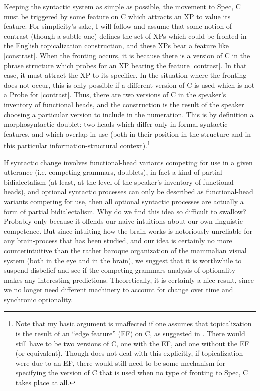 Keeping the syntactic system as simple as possible, the movement to Spec, C must be triggered by some feature on C which attracts an XP to value its feature.
For simplicity's sake, I will follow \citet{caitldiss} and assume that some notion of contrast (though a subtle one) defines the set of XPs which could be fronted in the English topicalization construction, and these XPs bear a feature like [constrast].
When the fronting occurs, it is because there is a version of C in the phrase structure which probes for an XP bearing the feature [contrast].
In that case, it must attract the XP to its specifier.
In the situation where the fronting does not occur, this is only possible if a different version of C is used which is not a Probe for [contrast].
Thus, there are two versions of C in the speaker's inventory of functional heads, and the construction is the result of the speaker choosing a particular version to include in the numeration.
This is by definition a morphosyntactic doublet: two heads which differ only in formal syntactic features, and which overlap in use (both in their position in the structure and in this particular information-structural context).\footnote{Note that my basic argument is unaffected if one assumes that topicalization is the result of an ``edge feature'' (EF) on C, as suggested in \citet[][151]{chomsky2008}.
There would still have to be two versions of C, one with the EF, and one without the EF (or equivalent).
Though \citet{chomsky2008} does not deal with this explicitly, if topicalization were due to an EF, there would still need to be some mechanism for specifying the version of C that is used when no type of fronting to Spec, C takes place at all.} 

If syntactic change involves functional-head variants competing for use in a given utterance (i.e. competing grammars, doublets), in fact a kind of partial bidialectalism (at least, at the level of the speaker's inventory of functional heads), and optional syntactic processes can only be described as functional-head variants competing for use, then all optional syntactic processes are actually a form of partial bidialectalism.
Why do we find this idea so difficult to swallow? Probably only because it offends our naive intuitions about our own linguistic competence.
But since intuiting how the brain works is notoriously unreliable for any brain-process that has been studied, and our idea is certainly no more counterintuitive than the rather baroque organization of the mammalian visual system (both in the eye and in the brain), we suggest that it is worthwhile to suspend disbelief and see if the competing grammars analysis of optionality makes any interesting predictions.
Theoretically, it is certainly a nice result, since we no longer need different machinery to account for change over time and synchronic optionality.


